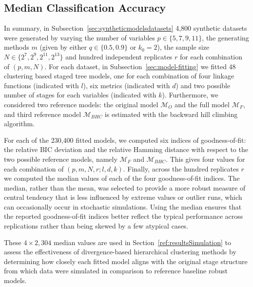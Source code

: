 \documentclass[preprint,12pt]{elsarticle}
\newcommand{\red}{\color{red}}
\begin{document}
\subsection{Median Classification Accuracy}
In summary, in Subsection~\ref{sec:syntheticmodelsdatasets} 4,800 synthetic datasets were generated by varying the number of variables $p\in \{5,7,9,11\}$, the generating methods $m$ (given by either $q\in \{0.5,0.9\}$ or $k_0=2$), the sample size $N\in \{ 2^7,2^9,2^{11},2^{13} \}$ and hundred independent replicates $r$ for each combination of $(p, m, N)$. For each dataset, in Subsection~\ref{sec:model-fitting} we fitted 48 clustering based staged tree models, one for each combination of four linkage functions (indicated with $l$), six metrics (indicated with $d$) and two possible number of stages for each variables (indicated with $k$). Furthermore, we considered two reference models: the original model $\mathcal M_O$ and the full model $\mathcal M_F$, and third reference model $\mathcal M_{BHC}$ is estimated with the backward hill climbing algorithm.

For each of the 230,400 fitted models, we computed six indices of goodness-of-fit: the relative BIC deviation and the relative Hamming distance with respect to the two possible reference models, namely $\mathcal M_F$ and $\mathcal M_{BHC} $. 
This gives four values for each combination of $(p, m, N, r; l, d, k)$.
Finally, across the hundred replicates $r$ we computed the median values of each of the four goodness-of-fit indices. The median, rather than the mean, was selected to provide a more robust measure of central tendency that is less influenced by extreme values or outlier runs, which can occasionally occur in stochastic simulations. Using the median ensures that the reported goodness-of-fit indices better reflect the typical performance across replications rather than being skewed by a few atypical cases.

These $4 \times 2,304$ median values are used in Section~\ref{ref:resultsSimulation} to assess the effectiveness of divergence-based hierarchical clustering methods by determining how closely each fitted model aligns with the original stage structure from which data were simulated in comparison to reference baseline robust models.



\end{document}
